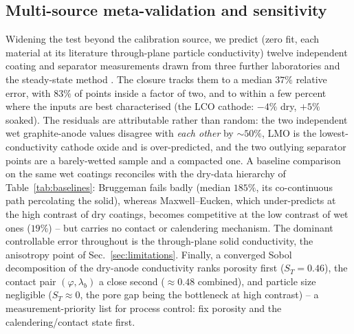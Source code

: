 \documentclass[10pt,a4paper]{article}
\begin{document}
\subsection{Multi-source meta-validation and sensitivity}
\label{sec:results:meta}
Widening the test beyond the calibration source, we predict (zero fit, each material at its literature through-plane particle conductivity) twelve independent coating and separator measurements drawn from three further laboratories and the steady-state method \cite{burheim2013,marconnet2018,richter2017}. The closure tracks them to a median $37\%$ relative error, with $83\%$ of points inside a factor of two, and to within a few percent where the inputs are best characterised (the LCO cathode: $-4\%$ dry, $+5\%$ soaked). The residuals are attributable rather than random: the two independent wet graphite-anode values disagree with \emph{each other} by $\sim50\%$, LMO is the lowest-conductivity cathode oxide and is over-predicted, and the two outlying separator points are a barely-wetted sample and a compacted one. A baseline comparison on the same wet coatings reconciles with the dry-data hierarchy of Table~\ref{tab:baselines}: Bruggeman fails badly (median $185\%$, its co-continuous path percolating the solid), whereas Maxwell--Eucken, which under-predicts at the high contrast of dry coatings, becomes competitive at the low contrast of wet ones ($19\%$) -- but carries no contact or calendering mechanism. The dominant controllable error throughout is the through-plane solid conductivity, the anisotropy point of Sec.~\ref{sec:limitations}. Finally, a converged Sobol decomposition of the dry-anode conductivity ranks porosity first ($S_T=0.46$), the contact pair $(\varphi,\lambda_b)$ a close second ($\approx0.48$ combined), and particle size negligible ($S_T\approx0$, the pore gap being the bottleneck at high contrast) -- a measurement-priority list for process control: fix porosity and the calendering/contact state first.
\end{document}
